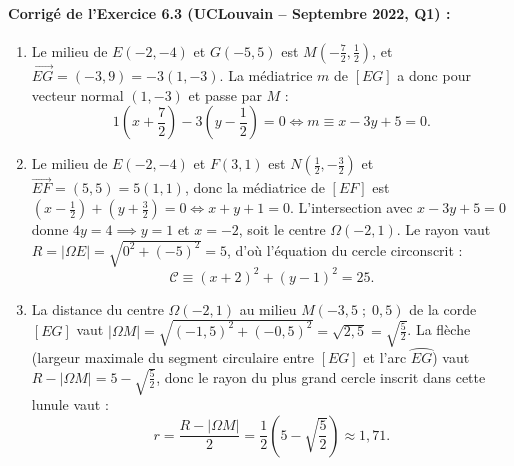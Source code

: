 \paragraph{Corrigé de l'Exercice 6.3 (UCLouvain -- Septembre 2022, Q1) :}
\begin{enumerate}[label=(\alph*)]
    \item Le milieu de $E(-2,-4)$ et $G(-5,5)$ est $M\left(-\frac{7}{2}, \frac{1}{2}\right)$, et $\overrightarrow{EG} = (-3, 9) = -3(1, -3)$. La médiatrice $m$ de $[EG]$ a donc pour vecteur normal $(1, -3)$ et passe par $M$ :
    \[
        1\left(x + \frac{7}{2}\right) - 3\left(y - \frac{1}{2}\right) = 0 \iff \boxed{m \equiv x - 3y + 5 = 0}.
    \]
    \item Le milieu de $E(-2,-4)$ et $F(3,1)$ est $N\left(\frac{1}{2}, -\frac{3}{2}\right)$ et $\overrightarrow{EF} = (5, 5) = 5(1, 1)$, donc la médiatrice de $[EF]$ est $(x - \frac{1}{2}) + (y + \frac{3}{2}) = 0 \iff x + y + 1 = 0$. L'intersection avec $x - 3y + 5 = 0$ donne $4y = 4 \implies y = 1$ et $x = -2$, soit le centre $\Omega(-2, 1)$. Le rayon vaut $R = |\Omega E| = \sqrt{0^2 + (-5)^2} = 5$, d'où l'équation du cercle circonscrit :
    \[
        \boxed{\mathcal{C} \equiv (x + 2)^2 + (y - 1)^2 = 25}.
    \]
    \item La distance du centre $\Omega(-2,1)$ au milieu $M(-3,5\;;\; 0,5)$ de la corde $[EG]$ vaut $|\Omega M| = \sqrt{(-1,5)^2 + (-0,5)^2} = \sqrt{2,5} = \sqrt{\frac{5}{2}}$. La flèche (largeur maximale du segment circulaire entre $[EG]$ et l'arc $\wideparen{EG}$) vaut $R - |\Omega M| = 5 - \sqrt{\frac{5}{2}}$, donc le rayon du plus grand cercle inscrit dans cette lunule vaut :
    \[
        r = \frac{R - |\Omega M|}{2} = \boxed{\frac{1}{2}\left(5 - \sqrt{\frac{5}{2}}\right) \approx 1,71}.
    \]
\end{enumerate}

